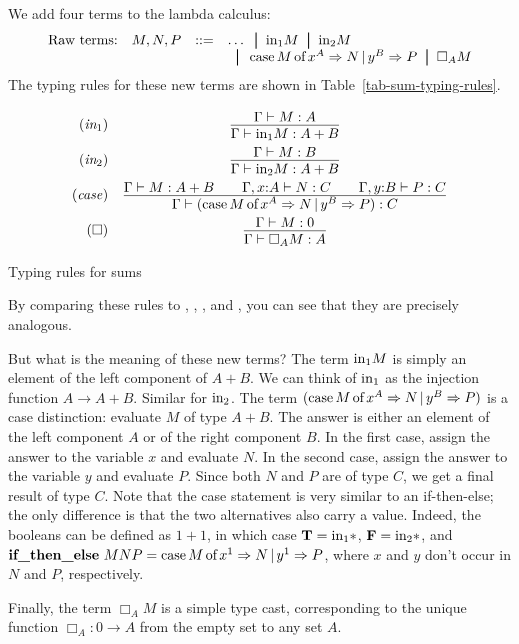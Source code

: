 \documentclass{article}
\begin{document}
We add four terms to the lambda calculus:
\[ \begin{array}{lll}
  \mbox{Raw terms:}\ssep M,N,P &\bnf&\ldots\bor \inj1 M\bor \inj2 M \\
  && \bor
  \caseof{M}{x}{A}{N}{y}{B}{P} \bor \Box_A M
\end{array}
\]
The typing rules for these new terms are shown in
Table~\ref{tab-sum-typing-rules}.
\begin{table*}[tbp]
\[ \begin{array}{rc}
        \tjinja
&       \deriv{\Gamma\tj M:A}{\Gamma\tj \inj1 M:A+B}
\nl     \tjinjb
&       \deriv{\Gamma\tj M:B}{\Gamma\tj \inj2 M:A+B}
\nl     \tjcase
&       \deriv{\Gamma\tj M: A+B\sep\Gamma,\typ{x}{A}\tj N: C
  \sep\Gamma,\typ{y}{B}\tj P: C}
                {\Gamma\tj (\caseof{M}{x}{A}{N}{y}{B}{P}): C}
\nl     \tjbox
&       \deriv{\Gamma\tj M: 0}
                {\Gamma\tj\Box_A M:A}
\end{array}
\]
\caption{Typing rules for sums}
\label{tab-sum-typing-rules}
\end{table*}
By comparing these rules to ,
, , and , you
can see that they are precisely analogous.

But what is the meaning of these new terms? The term $\mbox{\rm in}_1 M$ is
simply an element of the left component of $A+B$. We can think of
$\mbox{\rm in}_1$ as the injection function $A\to A+B$. Similar for $\mbox{\rm in}_2$.
The term $(\mathop{\mbox{\rm case}}M\mathop{\mbox{\rm of}}x^A\Rightarrow N\mathop{|}y^B\Rightarrow P)$ is a case distinction:
evaluate $M$ of type $A+B$. The answer is either an element of the
left component $A$ or of the right component $B$. In the first case,
assign the answer to the variable $x$ and evaluate $N$. In the second
case, assign the answer to the variable $y$ and evaluate $P$. Since
both $N$ and $P$ are of type $C$, we get a final result of type $C$.
Note that the case statement is very similar to an if-then-else; the
only difference is that the two alternatives also carry a value.
Indeed, the booleans can be defined as $1+1$, in which case
${\bf T}=\mbox{\rm in}_1{*}$, ${\bf F}=\mbox{\rm in}_2{*}$, and $\mathop{\textbf{\bf if\_then\_else}\,}
MNP=\mathop{\mbox{\rm case}}M\mathop{\mbox{\rm of}}x^1\Rightarrow N\mathop{|}y^1\Rightarrow P$, where $x$ and $y$ don't occur in
$N$ and $P$, respectively.

Finally, the term $\Box_A M$ is a simple type cast, corresponding to
the unique function $\Box_A:0\to A$ from the empty set to any set $A$.
\end{document}
